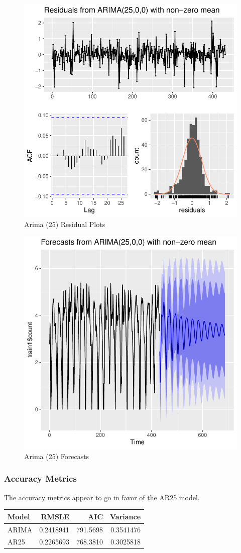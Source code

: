 \documentclass[american,]{article}
\begin{document}
\begin{figure}[htbp]

{\centering \includegraphics[width=0.45\linewidth]{BikeSharingDemand_files/figure-latex/arima-25-plot-1-1} 

}

\caption{Arima (25) Residual Plots}\label{fig:arima-25-plot-1}
\end{figure}

\begin{figure}[htbp]

{\centering \includegraphics[width=0.45\linewidth]{BikeSharingDemand_files/figure-latex/arima-25-plot-2-1} 

}

\caption{Arima (25) Forecasts}\label{fig:arima-25-plot-2}
\end{figure}

\newpage

\hypertarget{accuracy-metrics}{%
\subsubsection{Accuracy Metrics}\label{accuracy-metrics}}

The accuracy metrics appear to go in favor of the AR25 model.

\begin{table}[H]
\centering
\begin{tabular}{lrrr}
\toprule
Model & RMSLE & AIC & Variance\\
\midrule
ARIMA & 0.2418941 & 791.5698 & 0.3541476\\
AR25 & 0.2265693 & 768.3810 & 0.3025818\\
\bottomrule
\end{tabular}
\end{table}
\end{document}
